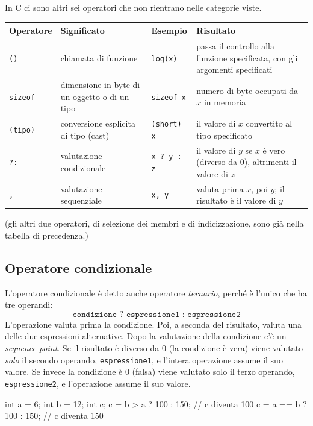 \documentclass[11pt,a4paper]{article}
\begin{document}
In C ci sono altri sei operatori che non rientrano nelle categorie viste.

\begin{center}
\begin{tabular}{l p{3.6cm} l p{5.2cm}}
\toprule
Operatore & Significato & Esempio & Risultato\\
\midrule
\lstinline|()| & chiamata di funzione & \lstinline|log(x)| & passa il controllo alla funzione specificata, con gli argomenti specificati\\
\lstinline|sizeof| & dimensione in byte di un oggetto o di un tipo & \lstinline|sizeof x| & numero di byte occupati da $x$ in memoria\\
\lstinline|(tipo)| & conversione esplicita di tipo (cast) & \lstinline|(short) x| & il valore di $x$ convertito al tipo specificato\\
\lstinline|?:| & valutazione condizionale & \lstinline|x ? y : z| & il valore di $y$ se $x$ è vero (diverso da $0$), altrimenti il valore di $z$\\
\lstinline|,| & valutazione sequenziale & \lstinline|x, y| & valuta prima $x$, poi $y$; il risultato è il valore di $y$\\
\bottomrule
\end{tabular}
\end{center}
(gli altri due operatori, di selezione dei membri e di indicizzazione, sono già nella tabella di precedenza.)

\subsection{Operatore condizionale}

L'operatore condizionale è detto anche operatore \emph{ternario}, perché è l'unico che ha tre operandi:
\[
\texttt{condizione ? espressione1 : espressione2}
\]
L'operazione valuta prima la condizione. Poi, a seconda del risultato, valuta una delle due espressioni alternative. Dopo la valutazione della condizione c'è un \emph{sequence point}. Se il risultato è diverso da $0$ (la condizione è vera) viene valutato \emph{solo} il secondo operando, \texttt{espressione1}, e l'intera operazione assume il suo valore. Se invece la condizione è $0$ (falsa) viene valutato solo il terzo operando, \texttt{espressione2}, e l'operazione assume il suo valore.

\begin{esempio}
\begin{codice}
int a = 6;
int b = 12;
int c;
c = b > a ? 100 : 150;     // c diventa 100
c = a == b ? 100 : 150;    // c diventa 150
\end{codice}
\end{esempio}
\end{document}
